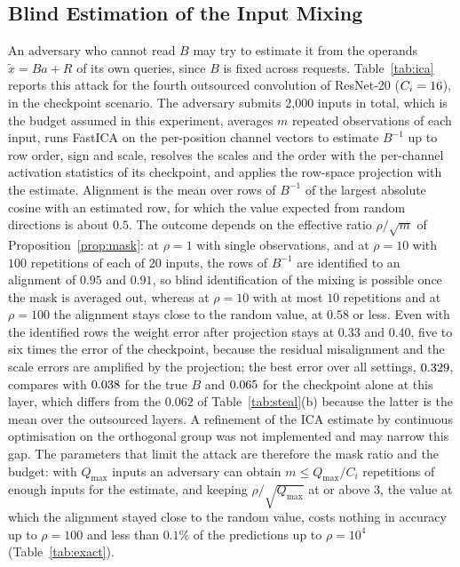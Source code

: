 \documentclass[lettersize,journal]{IEEEtran}
\begin{document}
\subsection{Blind Estimation of the Input Mixing}
An adversary who cannot read $B$ may try to estimate it from the operands $\tilde x=Ba+R$ of its own queries, since $B$ is fixed across requests. Table~\ref{tab:ica} reports this attack for the fourth outsourced convolution of ResNet-20 ($C_i=16$), in the checkpoint scenario. The adversary submits 2{,}000 inputs in total, which is the budget assumed in this experiment, averages $m$ repeated observations of each input, runs FastICA on the per-position channel vectors to estimate $B^{-1}$ up to row order, sign and scale, resolves the scales and the order with the per-channel activation statistics of its checkpoint, and applies the row-space projection with the estimate. Alignment is the mean over rows of $B^{-1}$ of the largest absolute cosine with an estimated row, for which the value expected from random directions is about $0.5$. The outcome depends on the effective ratio $\rho/\sqrt m$ of Proposition~\ref{prop:mask}: at $\rho=1$ with single observations, and at $\rho=10$ with $100$ repetitions of each of $20$ inputs, the rows of $B^{-1}$ are identified to an alignment of $0.95$ and $0.91$, so blind identification of the mixing is possible once the mask is averaged out, whereas at $\rho=10$ with at most $10$ repetitions and at $\rho=100$ the alignment stays close to the random value, at $0.58$ or less. Even with the identified rows the weight error after projection stays at $0.33$ and $0.40$, five to six times the error of the checkpoint, because the residual misalignment and the scale errors are amplified by the projection; the best error over all settings, $0.329$, compares with $0.038$ for the true $B$ and $0.065$ for the checkpoint alone at this layer, which differs from the $0.062$ of Table~\ref{tab:steal}(b) because the latter is the mean over the outsourced layers. A refinement of the ICA estimate by continuous optimisation on the orthogonal group was not implemented and may narrow this gap. The parameters that limit the attack are therefore the mask ratio and the budget: with $Q_{\max}$ inputs an adversary can obtain $m\le Q_{\max}/C_i$ repetitions of enough inputs for the estimate, and keeping $\rho/\sqrt{Q_{\max}}$ at or above $3$, the value at which the alignment stayed close to the random value, costs nothing in accuracy up to $\rho=100$ and less than $0.1\%$ of the predictions up to $\rho=10^4$ (Table~\ref{tab:exact}).
\end{document}
